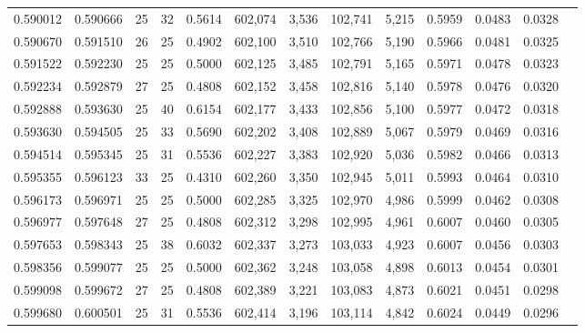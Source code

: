 \begin{tabular}{rrrrrrrrrrrrr}
0.590012 & 0.590666 &    25 &  32 &                                     0.5614 & 602,074 &   3,536 & 102,741 &   5,215 & 0.5959 & 0.0483 & 0.0328 \\
0.590670 & 0.591510 &    26 &  25 &                                     0.4902 & 602,100 &   3,510 & 102,766 &   5,190 & 0.5966 & 0.0481 & 0.0325 \\
0.591522 & 0.592230 &    25 &  25 &                                     0.5000 & 602,125 &   3,485 & 102,791 &   5,165 & 0.5971 & 0.0478 & 0.0323 \\
0.592234 & 0.592879 &    27 &  25 &                                     0.4808 & 602,152 &   3,458 & 102,816 &   5,140 & 0.5978 & 0.0476 & 0.0320 \\
0.592888 & 0.593630 &    25 &  40 &                                     0.6154 & 602,177 &   3,433 & 102,856 &   5,100 & 0.5977 & 0.0472 & 0.0318 \\
0.593630 & 0.594505 &    25 &  33 &                                     0.5690 & 602,202 &   3,408 & 102,889 &   5,067 & 0.5979 & 0.0469 & 0.0316 \\
0.594514 & 0.595345 &    25 &  31 &                                     0.5536 & 602,227 &   3,383 & 102,920 &   5,036 & 0.5982 & 0.0466 & 0.0313 \\
0.595355 & 0.596123 &    33 &  25 &                                     0.4310 & 602,260 &   3,350 & 102,945 &   5,011 & 0.5993 & 0.0464 & 0.0310 \\
0.596173 & 0.596971 &    25 &  25 &                                     0.5000 & 602,285 &   3,325 & 102,970 &   4,986 & 0.5999 & 0.0462 & 0.0308 \\
0.596977 & 0.597648 &    27 &  25 &                                     0.4808 & 602,312 &   3,298 & 102,995 &   4,961 & 0.6007 & 0.0460 & 0.0305 \\
0.597653 & 0.598343 &    25 &  38 &                                     0.6032 & 602,337 &   3,273 & 103,033 &   4,923 & 0.6007 & 0.0456 & 0.0303 \\
0.598356 & 0.599077 &    25 &  25 &                                     0.5000 & 602,362 &   3,248 & 103,058 &   4,898 & 0.6013 & 0.0454 & 0.0301 \\
0.599098 & 0.599672 &    27 &  25 &                                     0.4808 & 602,389 &   3,221 & 103,083 &   4,873 & 0.6021 & 0.0451 & 0.0298 \\
0.599680 & 0.600501 &    25 &  31 &                                     0.5536 & 602,414 &   3,196 & 103,114 &   4,842 & 0.6024 & 0.0449 & 0.0296 \\

\end{tabular}
